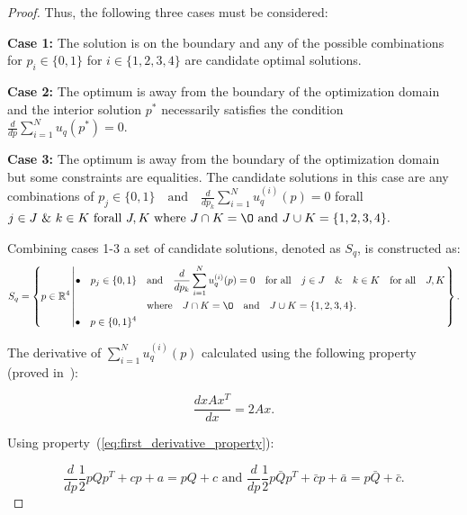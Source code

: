 \documentclass[10pt]{article}
\begin{document}
\begin{proof}
    Thus, the following three cases must be considered:

    \textbf{Case 1:} The solution is on the boundary and any of the possible
    combinations for $p_i \in \{0, 1\}$ for $i \in \{1, 2, 3, 4\}$ are candidate
    optimal solutions.

    \textbf{Case 2:} The optimum is away from the boundary of the optimization
    domain and the interior solution $p^*$ necessarily satisfies the condition
    \(\frac{d}{dp} \sum\limits_{i=1} ^ N  u_q(p^*) = 0\).

    \textbf{Case 3:} The optimum is away from the boundary of the optimization
    domain but some constraints are equalities. The candidate solutions in this
    case are any combinations of $p_j \in \{0, 1\} \quad \text{and} \quad
    \frac{d}{dp_k} \sum\limits_{i=1} ^ N  u_q^{(i)}(p) = 0$ forall $ j \in J
    \text{ \& } k \in K \text{ forall } J, K \text{ where } J \cap K = \O
    \text{ and } J \cup K = \{1, 2, 3, 4\}.$

    Combining cases 1-3 a set of candidate solutions, denoted as \(S_q\), is
    constructed as: {\scriptsize
    \begin{equation*}
        S_q =
        \left\{p \in \mathbb{R} ^ 4 \left|
            \begin{aligned}
                \bullet\quad p_j \in \{0, 1\} & \quad \text{and} \quad \frac{d}{dp_k}
                \sum\limits_{i=1} ^ N  u_q^{(i)}(p) = 0
                \quad \text{for all} \quad j \in J \quad \&  \quad k \in K  \quad \text{for all} \quad J, K \\
                & \quad \text{where} \quad J \cap K = \O \quad
                \text{and} \quad J \cup K = \{1, 2, 3, 4\}.\\
                \bullet\quad  p \in \{0, 1\} ^ 4
            \end{aligned}\right.
        \right\}.
    \end{equation*}}

    The derivative of \(\sum\limits_{i=1} ^ N  u_q^{(i)}(p)\) calculated using
    the following property (proved in~\cite{Abadir2005}):

    \begin{equation}\label{eq:first_derivative_property}
    \frac{d x A x^T}{dx} =  2Ax.
    \end{equation}

    Using property~(\ref{eq:first_derivative_property}):

    \begin{equation}\label{eq:quadratics_derivatives}
    \frac{d}{dp} \frac{1}{2}pQp^T + cp + a = pQ + c \text{ and } \frac{d}{dp} \frac{1}{2}p\bar{Q}p^T + \bar{c}p + \bar{a} = p\bar{Q} + \bar{c}.
    \end{equation}


\end{proof}
\end{document}

